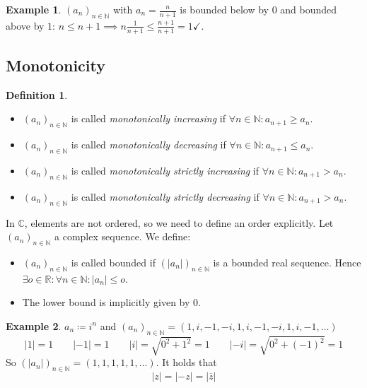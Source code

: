 \documentclass[a4paper,landscape,twocolumn]{article}
\theoremstyle{definition}
\newtheorem{defi}{Definition}
\newtheorem{ex}{Example}
\newcommand\abs[1]{\left|#1\right|}
\begin{document}
\begin{ex}
  $(a_n)_{n \in \mathbb N}$ with $a_n = \frac{n}{n+1}$ is bounded below by $0$
  and bounded above by $1$: $n \leq n+1 \implies n \frac{1}{n+1} \leq \frac{n+1}{n+1} = 1 \checkmark$.
\end{ex}

\subsection{Monotonicity}
\begin{defi}\hfill{}
  \begin{itemize}
    \item $(a_n)_{n \in \mathbb N}$ is called \emph{monotonically increasing} if $\forall n \in \mathbb N: a_{n+1} \geq a_n$.
    \item $(a_n)_{n \in \mathbb N}$ is called \emph{monotonically decreasing} if $\forall n \in \mathbb N: a_{n+1} \leq a_n$.
    \item $(a_n)_{n \in \mathbb N}$ is called \emph{monotonically strictly increasing} if $\forall n \in \mathbb N: a_{n+1} > a_n$.
    \item $(a_n)_{n \in \mathbb N}$ is called \emph{monotonically strictly decreasing} if $\forall n \in \mathbb N: a_{n+1} > a_n$.
  \end{itemize}
  In $\mathbb C$, elements are not ordered, so we need to define an order explicitly.
  Let $(a_n)_{n \in \mathbb N}$ a complex sequence. We define:
  \begin{itemize}
    \item $(a_n)_{n \in \mathbb N}$ is called bounded if $(\abs{a_n})_{n \in \mathbb N}$ is a bounded real sequence.
    Hence $\exists o \in \mathbb R: \forall n \in \mathbb N: \abs{a_n} \leq o$.
    \item The lower bound is implicitly given by $0$.
  \end{itemize}
\end{defi}

\begin{ex}
  $a_n \coloneqq i^n$ and $(a_n)_{n \in \mathbb N} = (1, i, -1, -i, 1, i, -1, -i, 1, i, -1, \dots)$
  \[ \abs{1} = 1 \qquad \abs{-1} = 1 \qquad \abs{i} = \sqrt{0^2 + 1^2} = 1 \qquad \abs{-i} = \sqrt{0^2 + (-1)^2} = 1 \]
  So $\left(\abs{a_n}\right)_{n \in \mathbb N} = (1, 1, 1, 1, 1, \dots)$.
  It holds that
  \[ \abs{z} = \abs{-z} = \abs{\overline{z}} \]
\end{ex}
\end{document}
